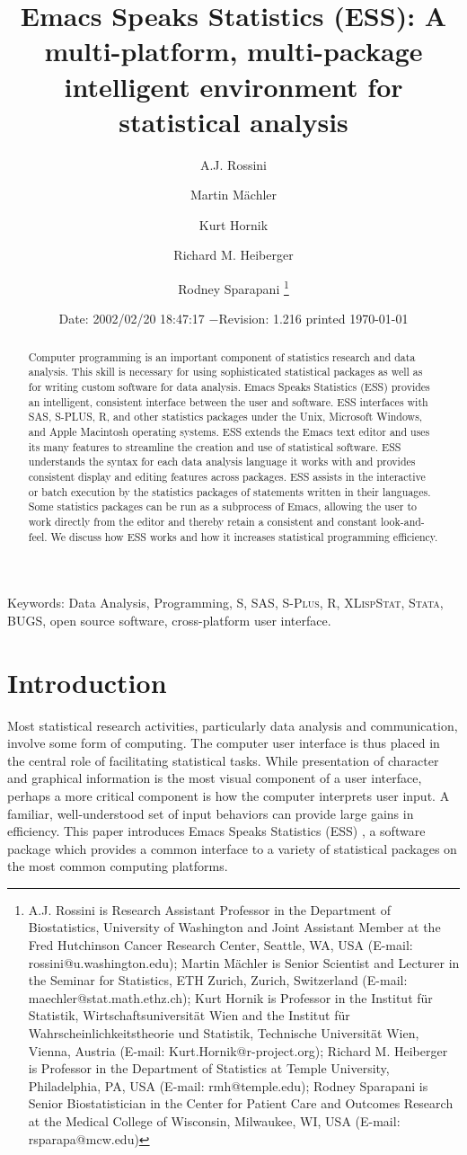 \documentclass{article}
\title{Emacs Speaks Statistics (ESS): A multi-platform, multi-package
intelligent environment for statistical analysis}
\author{A.J. Rossini \and Martin M{\"a}chler \and Kurt Hornik \and Richard
  M. Heiberger \and Rodney Sparapani \footnote{%
    A.J. Rossini is Research Assistant Professor in the Department of
    Biostatistics, University of Washington and Joint Assistant Member at
    the Fred Hutchinson Cancer Research Center, Seattle, WA, USA
    (E-mail: rossini@u.washington.edu);
    Martin M{\"a}chler is Senior Scientist and Lecturer in the Seminar for
    Statistics, ETH Zurich, Zurich, Switzerland
    (E-mail: maechler@stat.math.ethz.ch);
    Kurt Hornik is Professor in the Institut f{\"u}r Statistik,
    Wirtschaftsuniversit{\"a}t Wien and the Institut f{\"u}r
    Wahrscheinlichkeitstheorie und Statistik, Technische Universit{\"a}t
    Wien, Vienna, Austria (E-mail: Kurt.Hornik@r-project.org);
    Richard M. Heiberger is Professor in the Department of Statistics at
    Temple University, Philadelphia, PA, USA (E-mail: rmh@temple.edu);
    Rodney Sparapani is Senior Biostatistician in the Center for Patient
    Care and Outcomes Research at the Medical College of Wisconsin, 
    Milwaukee, WI, USA (E-mail: rsparapa@mcw.edu)}}
\date{$ $Date: 2002/02/20 18:47:17 $ - $Revision: 1.216 $ $\tiny printed \today}
\newif\ifdraft
\renewcommand{\baselinestretch}{1.5}
\newcommand*{\SAS}{\textsc{SAS}}
\newcommand*{\Splus}{\textsc{S-Plus}}
\newcommand*{\XLispStat}{\textsc{XLispStat}}
\newcommand*{\Stata}{\textsc{Stata}}
\begin{document}

\ifdraft
\setcounter{page}{0}
\tableofcontents
\fi

\maketitle

\ifdraft{}%
\else%
 \renewcommand{\baselinestretch}{1.5}
\fi

\begin{abstract}
  Computer programming is an important component of statistics
  research and data analysis.  This skill is necessary for using
  sophisticated statistical packages as well as for writing custom
  software for data analysis.  Emacs Speaks Statistics (ESS) provides
  an intelligent, consistent interface between the user and software.
  ESS interfaces with SAS, S-PLUS, R, and other statistics packages
  under the Unix, Microsoft Windows, and Apple Macintosh operating
  systems.  ESS extends the Emacs text editor and uses its many
  features to streamline the creation and use of statistical software.
  ESS understands the syntax for each data analysis language it works
  with and provides consistent display and editing features across
  packages.  ESS assists in the interactive or batch execution by the
  statistics packages of statements written in their languages.  Some
  statistics packages can be run as a subprocess of Emacs, allowing
  the user to work directly from the editor and thereby retain a
  consistent and constant look-and-feel.  We discuss how ESS works and
  how it increases statistical programming efficiency.
\end{abstract}

\noindent Keywords: Data Analysis, Programming, 
S, \SAS, \Splus, R, \XLispStat, \Stata, BUGS, open source software,
cross-platform user interface.

\section{Introduction}
\label{sec:introduction}

Most statistical research activities, particularly data analysis and
communication, involve some form of computing.  The computer user
interface is thus placed in the central role of facilitating
statistical tasks.  While presentation of character and graphical
information is the most visual component of a user interface,
perhaps a more critical component is how the computer interprets user
input.  A familiar, well-understood set of input behaviors can provide
large gains in efficiency.  This paper introduces Emacs Speaks
Statistics (ESS) \citep{ESS}, a software package which provides a
common interface to a variety of statistical packages on the most
common computing platforms.
\end{document}
